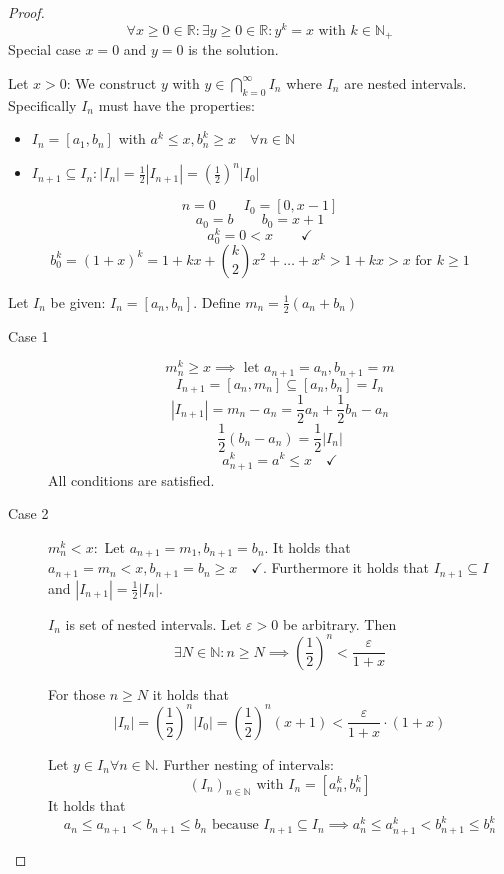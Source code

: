 \documentclass[a4paper,landscape,twocolumn]{article}
\theoremstyle{definition}
\newcommand\abs[1]{\left|#1\right|}
\begin{document}
\begin{proof}
  \[ \forall x \geq 0 \in \mathbb R: \exists y \geq 0 \in \mathbb R: y^k = x \text{ with } k \in \mathbb N_+ \]
  Special case $x = 0$ and $y = 0$ is the solution.

  Let $x > 0$: We construct $y$ with $y \in \bigcap_{k=0}^\infty I_n$
  where $I_n$ are nested intervals.
  Specifically $I_n$ must have the properties:
  \begin{itemize}
    \item $I_n = [a_1, b_n]$ with $a^k \leq x, b_n^k \geq x \quad \forall n \in \mathbb N$
    \item $I_{n+1} \subseteq I_n: \abs{I_n} = \frac12 \abs{I_{n+1}} = \left(\frac12\right)^n \abs{I_0}$
  \end{itemize}

  \[ n = 0 \qquad I_0 = [0, x-1] \]
  \[ a_0 = b \qquad b_0 = x + 1 \]
  \[ a_0^k = 0 < x \qquad\checkmark \]
  \[ b_0^k = (1 + x)^k = 1 + kx + \binom k2 x^2 + \dots + x^k > 1 + kx > x \text{ for } k \geq 1 \]

  Let $I_n$ be given: $I_n = [a_n, b_n]$.
  Define $m_n = \frac12 (a_n + b_n)$
  \begin{description}
    \item[Case 1]
      \[ m_n^k \geq x \implies \text{ let } a_{n+1} = a_n, b_{n+1} = m \]
      \[ I_{n+1} = [a_n, m_n] \subseteq [a_n, b_n] = I_n \]
      \[ \abs{I_{n+1}} = m_n - a_n = \frac12 a_n + \frac12 b_n - a_n \]
      \[ \frac12 (b_n - a_n) = \frac12 \abs{I_n} \]
      \[ a_{n+1}^k = a^k \leq x \quad\checkmark \]
      All conditions are satisfied.
    \item[Case 2] $m_n^k < x: $
      Let $a_{n+1} = m_1, b_{n+1} = b_n$.
      It holds that $a_{n+1} = m_n < x, b_{n+1} = b_n \geq x \quad\checkmark$.
      Furthermore it holds that $I_{n+1} \subseteq I$ and $\abs{I_{n+1}} = \frac12 \abs{I_n}$.

      $I_n$ is set of nested intervals.
      Let $\varepsilon > 0$ be arbitrary. Then
      \[ \exists N \in \mathbb N: n \geq N \implies \left(\frac12\right)^n < \frac{\varepsilon}{1 + x} \]

      For those $n \geq N$ it holds that
      \[
          \abs{I_n} = \left(\frac12\right)^n \abs{I_{0}}
          = \left(\frac12\right)^n (x + 1)
          < \frac{\varepsilon}{1 + x} \cdot (1 + x)
      \]

      Let $y \in I_n \forall n \in \mathbb N$.
      Further nesting of intervals:
      \[ (I_n)_{n \in \mathbb N} \text{ with } I_n = [a_n^k, b_n^k] \]
      It holds that
      \[
          a_n \leq a_{n+1} < b_{n+1} \leq b_n \text{ because } I_{n+1} \subseteq I_n
          \implies a_n^k \leq a_{n+1}^k < b_{n+1}^k \leq b_n^k
      \]


\end{description}
\end{proof}
\end{document}
